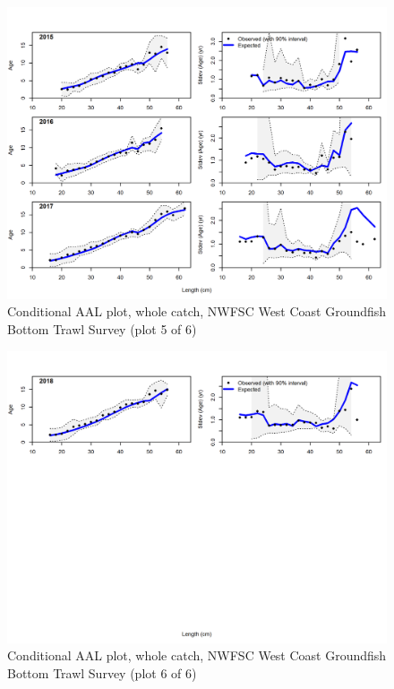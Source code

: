 \documentclass[12pt,]{article}
\begin{document}
\begin{figure}
\centering
\includegraphics{r4ss/plots_mod1/comp_condAALfit_Andre_plotsflt7mkt0_page5.png}
\caption{Conditional AAL plot, whole catch, NWFSC West Coast Groundfish
Bottom Trawl Survey (plot 5 of 6) \label{fig:nwfsc_combo_andre_5}}
\end{figure}

\begin{figure}
\centering
\includegraphics{r4ss/plots_mod1/comp_condAALfit_Andre_plotsflt7mkt0_page6.png}
\caption{Conditional AAL plot, whole catch, NWFSC West Coast Groundfish
Bottom Trawl Survey (plot 6 of 6) \label{fig:nwfsc_combo_andre_6}}
\end{figure}
\end{document}
